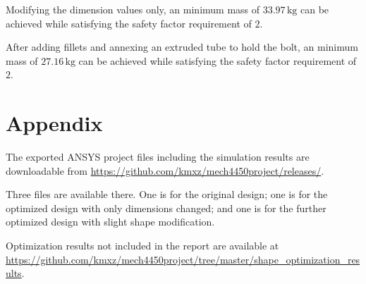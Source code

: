 \documentclass[a4paper,14pt]{extarticle}
\newcommand{\kg}{\,\si{\kilo\gram}}
\begin{document}
Modifying the dimension values only, an minimum mass of $33.97\kg$ can be achieved while satisfying the safety factor requirement of $2$. 

After adding fillets and annexing an extruded tube to hold the bolt, an minimum mass of $27.16\kg$ can be achieved while satisfying the safety factor requirement of $2$. 
\section{Appendix}
The exported ANSYS project files including the simulation results are downloadable from \url{https://github.com/kmxz/mech4450project/releases/}. 

Three files are available there. One is for the original design; one is for the optimized design with only dimensions changed; and one is for the further optimized design with slight shape modification.

Optimization results not included in the report are available at \url{https://github.com/kmxz/mech4450project/tree/master/shape_optimization_results}.
\end{document}
